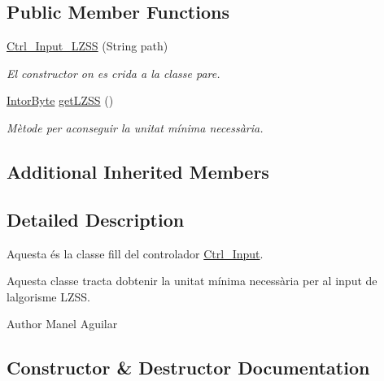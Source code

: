 \subsection*{Public Member Functions}
\begin{DoxyCompactItemize}
\item 
\hyperlink{classpersistencia_1_1input_1_1Ctrl__Input__LZSS_a00d5d178971cfd1d15604f97584368d5}{Ctrl\+\_\+\+Input\+\_\+\+L\+Z\+SS} (String path)
\begin{DoxyCompactList}\small\item\em El constructor on es crida a la classe pare. \end{DoxyCompactList}\item 
\hyperlink{classdomini_1_1utils_1_1IntorByte}{Intor\+Byte} \hyperlink{classpersistencia_1_1input_1_1Ctrl__Input__LZSS_a204d4d68a1d94725d9017b71bac0288e}{get\+L\+Z\+SS} ()
\begin{DoxyCompactList}\small\item\em Mètode per aconseguir la unitat mínima necessària. \end{DoxyCompactList}\end{DoxyCompactItemize}
\subsection*{Additional Inherited Members}


\subsection{Detailed Description}
Aquesta és la classe fill del controlador \hyperlink{classpersistencia_1_1input_1_1Ctrl__Input}{Ctrl\+\_\+\+Input}. 

Aquesta classe tracta d\textquotesingle{}obtenir la unitat mínima necessària per al input de l\textquotesingle{}algorisme L\+Z\+SS.

\begin{DoxyAuthor}{Author}
Manel Aguilar 
\end{DoxyAuthor}


\subsection{Constructor \& Destructor Documentation}
\mbox{\label{classpersistencia_1_1input_1_1Ctrl__Input__LZSS_a00d5d178971cfd1d15604f97584368d5}} 
